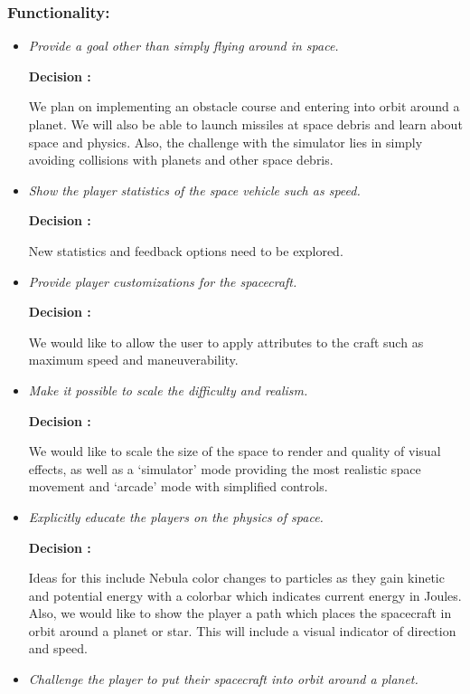 \subsubsection*{Functionality:}
\begin{itemize}
  \item \emph{Provide a goal other than simply flying around in space.}
        
        \textbf{Decision : } \parbox[t]{5in}{We plan on implementing an obstacle course and entering into orbit around a planet.  We will also be able to launch missiles at space debris and learn about space and physics.  Also, the challenge with the simulator lies in simply avoiding collisions with planets and other space debris.}

  \item \emph{Show the player statistics of the space vehicle such as speed.}
        
        \textbf{Decision : } \parbox[t]{5in}{New statistics and feedback options need to be explored.}

  \item \emph{Provide player customizations for the spacecraft.}
        
        \textbf{Decision : } \parbox[t]{5in}{We would like to allow the user to apply attributes to the craft such as maximum speed and maneuverability.}

  \item \emph{Make it possible to scale the difficulty and realism.}
        
        \textbf{Decision : } \parbox[t]{5in}{We would like to scale the size of the space to render and quality of visual effects, as well as a `simulator' mode providing the most realistic space movement and `arcade' mode with simplified controls.}

  \item \emph{Explicitly educate the players on the physics of space.}
        
        \textbf{Decision : } \parbox[t]{5in}{Ideas for this include Nebula color changes to particles as they gain kinetic and potential energy with a colorbar which indicates current energy in Joules.  Also, we would like to show the player a path which places the spacecraft in orbit around a planet or star.  This will include a visual indicator of direction and speed.}

  \item \emph{Challenge the player to put their spacecraft into orbit around a planet.}
        

\end{itemize}
